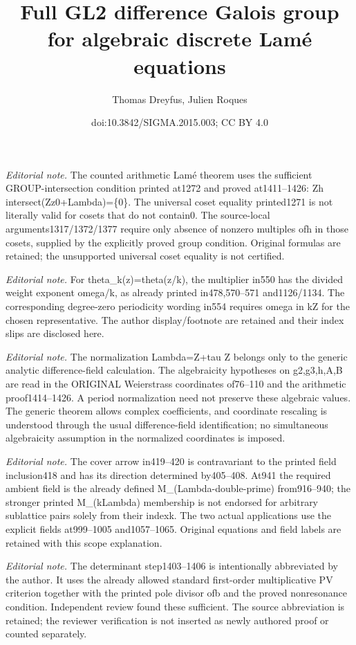 \documentclass[10pt,a4paper]{amsart}
\title{Full GL2 difference Galois group for algebraic discrete Lamé equations}
\author{Thomas Dreyfus, Julien Roques}
\date{doi:10.3842/SIGMA.2015.003; CC BY 4.0}
\numberwithin{equation}{section}
\begin{document}
\maketitle
\noindent\textit{Editorial note.} The counted arithmetic Lamé theorem uses the sufficient GROUP-intersection condition printed at1272 and proved at1411–1426: Zh intersect(Zz0+Lambda)=\{0\}. The universal coset equality printed1271 is not literally valid for cosets that do not contain0. The source-local arguments1317/1372/1377 require only absence of nonzero multiples ofh in those cosets, supplied by the explicitly proved group condition. Original formulas are retained; the unsupported universal coset equality is not certified.\par\medskip
\noindent\textit{Editorial note.} For theta\_k(z)=theta(z/k), the multiplier in550 has the divided weight exponent omega/k, as already printed in478,570–571 and1126/1134. The corresponding degree-zero periodicity wording in554 requires omega in kZ for the chosen representative. The author display/footnote are retained and their index slips are disclosed here.\par\medskip
\noindent\textit{Editorial note.} The normalization Lambda=Z+tau Z belongs only to the generic analytic difference-field calculation. The algebraicity hypotheses on g2,g3,h,A,B are read in the ORIGINAL Weierstrass coordinates of76–110 and the arithmetic proof1414–1426. A period normalization need not preserve these algebraic values. The generic theorem allows complex coefficients, and coordinate rescaling is understood through the usual difference-field identification; no simultaneous algebraicity assumption in the normalized coordinates is imposed.\par\medskip
\noindent\textit{Editorial note.} The cover arrow in419–420 is contravariant to the printed field inclusion418 and has its direction determined by405–408. At941 the required ambient field is the already defined M\_(Lambda-double-prime) from916–940; the stronger printed M\_(kLambda) membership is not endorsed for arbitrary sublattice pairs solely from their indexk. The two actual applications use the explicit fields at999–1005 and1057–1065. Original equations and field labels are retained with this scope explanation.\par\medskip
\noindent\textit{Editorial note.} The determinant step1403–1406 is intentionally abbreviated by the author. It uses the already allowed standard first-order multiplicative PV criterion together with the printed pole divisor ofb and the proved nonresonance condition. Independent review found these sufficient. The source abbreviation is retained; the reviewer verification is not inserted as newly authored proof or counted separately.\par\medskip
\end{document}
